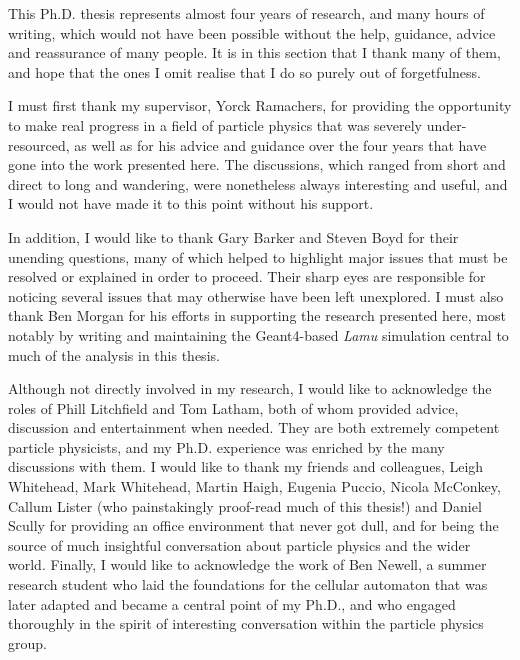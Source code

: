 This Ph.D. thesis represents almost four years of research, and many hours of writing, which would not have been possible without the help, guidance, advice and reassurance of many people. It is in this section that I thank many of them, and hope that the ones I omit realise that I do so purely out of forgetfulness.

I must first thank my supervisor, Yorck Ramachers, for providing the opportunity to make real progress in a field of particle physics that was severely under-resourced, as well as for his advice and guidance over the four years that have gone into the work presented here. The discussions, which ranged from short and direct to long and wandering, were nonetheless always interesting and useful, and I would not have made it to this point without his support.

In addition, I would like to thank Gary Barker and Steven Boyd for their unending questions, many of which helped to highlight major issues that must be resolved or explained in order to proceed. Their sharp eyes are responsible for noticing several issues that may otherwise have been left unexplored. I must also thank Ben Morgan for his efforts in supporting the research presented here, most notably by writing and maintaining the Geant4-based \emph{Lamu} simulation central to much of the analysis in this thesis.

Although not directly involved in my research, I would like to acknowledge the roles of Phill Litchfield and Tom Latham, both of whom provided advice, discussion and entertainment when needed. They are both extremely competent particle physicists, and my Ph.D. experience was enriched by the many discussions with them. I would like to thank my friends and colleagues, Leigh Whitehead, Mark Whitehead, Martin Haigh, Eugenia Puccio, Nicola McConkey, Callum Lister (who painstakingly proof-read much of this thesis!) and Daniel Scully for providing an office environment that never got dull, and for being the source of much insightful conversation about particle physics and the wider world. Finally, I would like to acknowledge the work of Ben Newell, a summer research student who laid the foundations for the cellular automaton that was later adapted and became a central point of my Ph.D., and who engaged thoroughly in the spirit of interesting conversation within the particle physics group.
